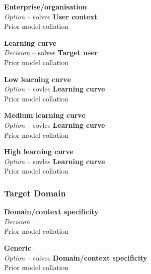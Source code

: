 \textbf{Enterprise/organisation} \\ \emph{Option} -- solves \textbf{User context} \\ Prior model collation \cite{Minhas2012,Patel2010}

\textbf{Learning curve} \\ \emph{Decision} -- solves \textbf{Target user} \\ Prior model collation \cite{Minhas2012}


\textbf{Low learning curve} \\ \emph{Option} -- sovles \textbf{Learning curve} \\ Prior model collation \cite{Minhas2012}

\textbf{Medium learning curve} \\ \emph{Option} -- sovles \textbf{Learning curve} \\ Prior model collation \cite{Minhas2012}

\textbf{High learning curve} \\ \emph{Option} -- sovles \textbf{Learning curve} \\ Prior model collation \cite{Minhas2012}

\subsubsection{Target Domain}

\textbf{Domain/context specificity} \\ \emph{Decision} \\ Prior model collation \cite{Aghaee2012}


\textbf{Generic} \\ \emph{Option} -- solves \textbf{Domain/context specificity} \\ Prior model collation \cite{Aghaee2012}


